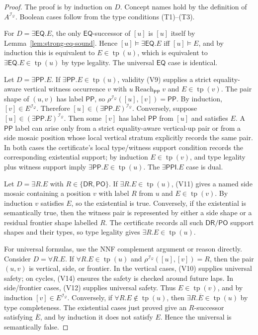 \documentclass[11pt]{article}
\newcommand{\EQ}{\mathsf{EQ}}
\newcommand{\DR}{\mathsf{DR}}
\newcommand{\PO}{\mathsf{PO}}
\newcommand{\PP}{\mathsf{PP}}
\newcommand{\PPI}{\mathsf{PPI}}
\newcommand{\I}{\mathcal I}
\newcommand{\Q}{\mathcal Q}
\newcommand{\typ}{\operatorname{tp}}
\newcommand{\reach}{\operatorname{Reach}}
\begin{document}
\begin{proof}
The proof is by induction on $D$.  Concept names hold by the definition of $A^{\I_\Q}$.  Boolean cases follow from the type conditions (T1)--(T3).

For $D=\exists\EQ.E$, the only $\EQ$-successor of $[u]$ is $[u]$ itself by Lemma~\ref{lem:strong-eq-sound}.  Hence $[u]\models\exists\EQ.E$ iff $[u]\models E$, and by induction this is equivalent to $E\in\typ(u)$, which is equivalent to $\exists\EQ.E\in\typ(u)$ by type legality.  The universal $\EQ$ case is identical.

Let $D=\exists\PP.E$.  If $\exists\PP.E\in\typ(u)$, validity (V9) supplies a strict equality-aware vertical witness occurrence $v$ with $u\reach_\PP v$ and $E\in\typ(v)$.  The pair shape of $(u,v)$ has label $\PP$, so $\rho^{\I_\Q}([u],[v])=\PP$.  By induction, $[v]\in E^{\I_\Q}$.  Therefore $[u]\in(\exists\PP.E)^{\I_\Q}$.  Conversely, suppose $[u]\in(\exists\PP.E)^{\I_\Q}$.  Then some $[v]$ has label $\PP$ from $[u]$ and satisfies $E$.  A $\PP$ label can arise only from a strict equality-aware vertical-up pair or from a side mosaic position whose local vertical stratum explicitly records the same pair.  In both cases the certificate's local type/witness support condition records the corresponding existential support; by induction $E\in\typ(v)$, and type legality plus witness support imply $\exists\PP.E\in\typ(u)$.  The $\exists\PPI.E$ case is dual.

Let $D=\exists R.E$ with $R\in\{\DR,\PO\}$.  If $\exists R.E\in\typ(u)$, (V11) gives a named side mosaic containing a position $v$ with label $R$ from $u$ and $E\in\typ(v)$.  By induction $v$ satisfies $E$, so the existential is true.  Conversely, if the existential is semantically true, then the witness pair is represented by either a side shape or a residual frontier shape labelled $R$.  The certificate records all such $\DR/\PO$ support shapes and their types, so type legality gives $\exists R.E\in\typ(u)$.

For universal formulas, use the NNF complement argument or reason directly.  Consider $D=\forall R.E$.  If $\forall R.E\in\typ(u)$ and $\rho^{\I_\Q}([u],[v])=R$, then the pair $(u,v)$ is vertical, side, or frontier.  In the vertical cases, (V10) supplies universal safety; on cycles, (V14) ensures the safety is checked around future laps.  In side/frontier cases, (V12) supplies universal safety.  Thus $E\in\typ(v)$, and by induction $[v]\in E^{\I_\Q}$.  Conversely, if $\forall R.E\notin\typ(u)$, then $\exists R.\overline E\in\typ(u)$ by type completeness.  The existential cases just proved give an $R$-successor satisfying $\overline E$, and by induction it does not satisfy $E$.  Hence the universal is semantically false.
\end{proof}
\end{document}
